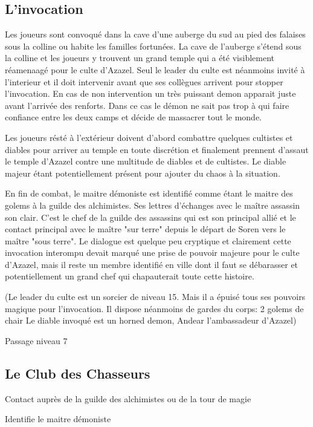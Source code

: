 \subsection*{L'invocation}

Les joueurs sont convoqué dans la cave d'une auberge du sud au pied des falaises 
sous la colline ou habite les familles fortunées. La cave de l'auberge s'étend 
sous la colline et les joueurs y trouvent un grand temple qui a été visiblement 
réamenaagé pour le culte d'Azazel. Seul le leader du culte est néanmoins invité à
l'interieur et il doit intervenir avant que ses collègues arrivent pour stopper 
l'invocation. En cas de non intervention un très puissant demon apparait juste 
avant l'arrivée des renforts. Dans ce cas le démon ne sait pas trop à qui faire 
confiance entre les deux camps et décide de massacrer tout le monde.

Les joueurs résté à l'extérieur doivent d'abord combattre quelques cultistes et diables 
pour arriver au temple en toute discrétion et finalement prennent d'assaut le
temple d'Azazel contre une multitude de diables et de cultistes. Le diable majeur étant 
potentiellement présent pour ajouter du chaos à la situation.

En fin de combat, le maitre démoniste est identifié comme étant le maitre des 
golems à la guilde des alchimistes. Ses lettres d'échanges avec le maître assassin
son clair. C'est le chef de la guilde des assassins qui est son principal allié 
et le contact principal avec le maître "sur terre" depuis le départ de Soren vers le 
maître "sous terre". Le dialogue est quelque peu cryptique et clairement cette invocation
interompu devait marqué une prise de pouvoir majeure pour le culte d'Azazel, mais
il reste un membre identifié en ville dont il faut se débarasser et potentiellement
un grand chef qui chapauterait toute cette histoire.

(Le leader du culte est un sorcier de niveau 15. Mais il a épuisé tous ses pouvoirs
magique pour l'invocation. Il dispose néanmoins de gardes du corps: 2 golems de chair
Le diable invoqué est un horned demon, Andear l'ambassadeur d'Azazel)

Passage niveau 7

\subsection*{Le Club des Chasseurs}

Contact auprès de la guilde des alchimistes ou de la tour de magie


Identifie le maitre démoniste


